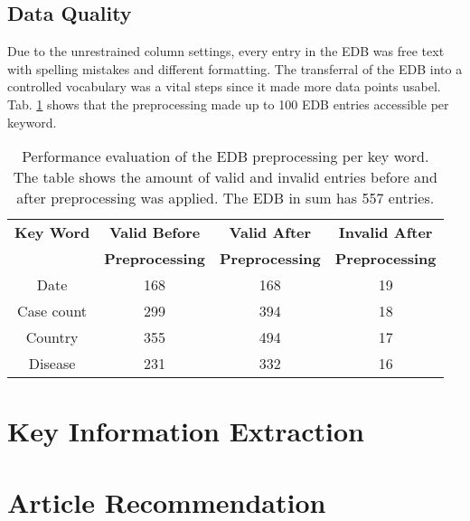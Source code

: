 \subsection{Data Quality}
Due to the unrestrained column settings, every entry in the EDB was free text with spelling mistakes and different formatting. The transferral of the EDB into a controlled vocabulary was a vital steps since it made more data points usabel. Tab. \ref{table:preprocessing performance} shows that the preprocessing made up to 100 EDB entries accessible per keyword.

\begin{table}
  \centering
  \caption{Performance evaluation of the EDB preprocessing per key word. The table shows the amount of valid and invalid entries before and after preprocessing was applied. The EDB in sum has 557 entries.  }
  \begin{tabular}{@{}cccc@{}}
    \toprule
    \textbf{Key Word} & \textbf{Valid Before} & \textbf{Valid After} & \textbf{Invalid After} \\
    & \textbf{Preprocessing} & \textbf{Preprocessing} & \textbf{Preprocessing} \\
    \midrule
    Date & 168 & 168 &  19 \\
    Case count & 299 & 394 &  18 \\
    Country & 355 & 494 &  17 \\
    Disease & 231 & 332 & 16 \\
    \bottomrule
  \end{tabular}
  \label{table:preprocessing performance}
\end{table}

\section{Key Information Extraction}
\section{Article Recommendation}
